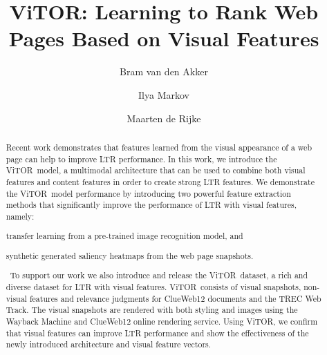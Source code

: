 \documentclass[sigconf,screen=true,anonymous]{acmart}
\title{ViTOR: Learning to Rank Web Pages Based on Visual Features}
\author{Bram van den Akker}
\affiliation{%
  \institution{University of Amsterdam}
  \city{Amsterdam} 
  \country{The Netherlands}
}
\author{Ilya Markov}
\affiliation{%
  \institution{University of Amsterdam}
  \city{Amsterdam} 
  \country{The Netherlands}  
}
\author{Maarten de Rijke}
\affiliation{%
   \institution{University of Amsterdam}
   \city{Amsterdam} 
   \country{The Netherlands}
}
\newcommand{\datasetname}{\ac{ViTOR}}
\newcommand{\modelname}{\ac{ViTOR}}
\begin{document}
%
%
\begin{abstract}
Recent work demonstrates that features learned from the visual appearance of a web page can help to improve \ac{LTR} performance. 
In this work, we introduce the \modelname~model, a multimodal architecture that can be used to combine both visual features and content features in order to create strong \ac{LTR} features. 
We demonstrate the \modelname~model performance by introducing two powerful feature extraction methods that significantly improve the performance of \ac{LTR} with visual features, namely: 
\begin{inparaenum}[(i)]
\item transfer learning from a pre-trained image recognition model, and
\item synthetic generated saliency heatmaps from the web page snapshots.
\end{inparaenum}\ 
To support our work we also introduce and release the \datasetname~dataset, a rich and diverse dataset for \ac{LTR} with visual features.
\datasetname~consists of visual snapshots, non-visual features and relevance judgments for ClueWeb12 documents and the TREC Web Track.
The visual snapshots are rendered with both styling and images using the Wayback Machine and ClueWeb12 online rendering service.
Using \datasetname, we confirm that visual features can improve \ac{LTR} performance
and show the effectiveness of the newly introduced architecture and visual feature vectors.
\end{abstract}

%
%
\end{document}
